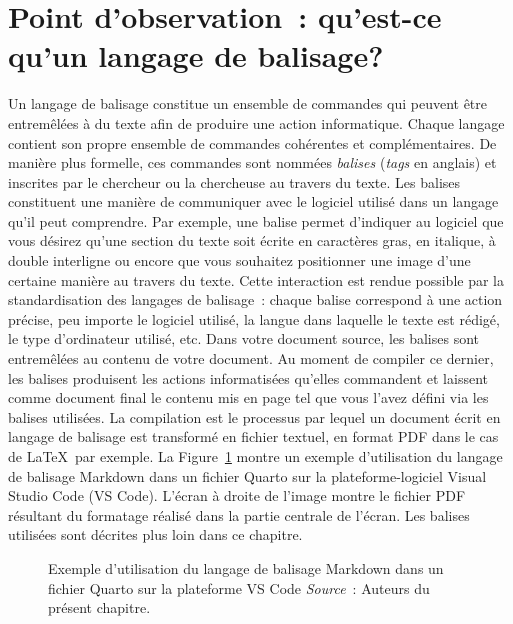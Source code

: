 \documentclass[
  letterpaper,
  DIV=11,
  numbers=noendperiod]{scrreprt}
\begin{document}
\section{Point d'observation~: qu'est-ce qu'un langage de
balisage?}\label{point-dobservation-quest-ce-quun-langage-de-balisage}

Un langage de balisage constitue un ensemble de commandes qui peuvent
être entremêlées à du texte afin de produire une action informatique.
Chaque langage contient son propre ensemble de commandes cohérentes et
complémentaires. De manière plus formelle, ces commandes sont nommées
\emph{balises} (\emph{tags} en anglais) et inscrites par le chercheur ou
la chercheuse au travers du texte. Les balises constituent une manière
de communiquer avec le logiciel utilisé dans un langage qu'il peut
comprendre. Par exemple, une balise permet d'indiquer au logiciel que
vous désirez qu'une section du texte soit écrite en caractères gras, en
italique, à double interligne ou encore que vous souhaitez positionner
une image d'une certaine manière au travers du texte. Cette interaction
est rendue possible par la standardisation des langages de balisage~:
chaque balise correspond à une action précise, peu importe le logiciel
utilisé, la langue dans laquelle le texte est rédigé, le type
d'ordinateur utilisé, etc. Dans votre document source, les balises sont
entremêlées au contenu de votre document. Au moment de compiler ce
dernier, les balises produisent les actions informatisées qu'elles
commandent et laissent comme document final le contenu mis en page tel
que vous l'avez défini via les balises utilisées. La compilation est le
processus par lequel un document écrit en langage de balisage est
transformé en fichier textuel, en format PDF dans le cas de \LaTeX~par
exemple. La Figure~\ref{fig-vscode} montre un exemple d'utilisation du
langage de balisage Markdown dans un fichier Quarto sur la
plateforme-logiciel Visual Studio Code (VS Code). L'écran à droite de
l'image montre le fichier PDF résultant du formatage réalisé dans la
partie centrale de l'écran. Les balises utilisées sont décrites plus
loin dans ce chapitre.

\begin{figure}


\caption{\label{fig-vscode}Exemple d'utilisation du langage de balisage
Markdown dans un fichier Quarto sur la plateforme VS Code
\newline \textit{Source}~: Auteurs du présent chapitre.}

\end{figure}%
\end{document}
